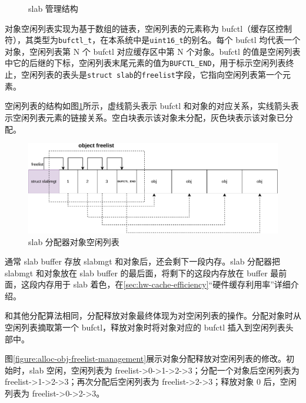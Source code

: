 \documentclass[AutoFakeBold]{LZUThesis}
\begin{document}
\begin{sloppypar}
\begin{figure}[H]
\centering

\caption{slab 管理结构}
\end{figure}

对象空闲列表实现为基于数组的链表，空闲列表的元素称为
bufctl（缓存区控制符），其类型为\texttt{bufctl\_t}，在本系统中是\texttt{uint16\_t}的别名。每个
bufctl 均代表一个对象，空闲列表第 N 个 bufctl 对应缓存区中第 N 个对象。bufctl 的值是空闲列表中它的后继的下标，空闲列表末尾元素的值为\texttt{BUFCTL\_END}，用于标示空闲列表终止，空闲列表的表头是\texttt{struct\ slab}的\texttt{freelist}字段，它指向空闲列表第一个元素。

空闲列表的结构如图\ref{figure:freelist-management}所示，虚线箭头表示 bufctl
和对象的对应关系，实线箭头表示空闲列表元素的链接关系。空白块表示该对象未分配，灰色块表示该对象已分配。

\begin{figure}[htb]
\centering
\includegraphics[scale=0.8]{images/freelist-management.drawio.pdf}
\caption{slab 分配器对象空闲列表}
\label{figure:freelist-management}
\end{figure}

通常 slab buffer 存放 slabmgt 和对象后，还会剩下一段内存。slab 分配器把 slabmgt 和对象放在 slab buffer 的最后面，将剩下的这段内存放在 buffer 最前面，这段内存用于 slab 着色，在\ref{sec:hw-cache-efficiency}“硬件缓存利用率”详细介绍。

和其他分配算法相同，分配释放对象最终体现为对空闲列表的操作。分配对象时从空闲列表摘取第一个 bufctl，释放对象时将对象对应的 bufctl 插入到空闲列表头部中。

图\ref{figure:alloc-obj-freelist-management}展示对象分配释放对空闲列表的修改。初始时，slab 空闲，空闲列表为 freelist-\textgreater0-\textgreater1-\textgreater2-\textgreater3；分配一个对象后空闲列表为
freelist-\textgreater1-\textgreater2-\textgreater3；再次分配后空闲列表为 freelist-\textgreater2-\textgreater3；释放对象 0 后，空闲列表为 freelist-\textgreater0-\textgreater2-\textgreater3。


\end{sloppypar}
\end{document}
